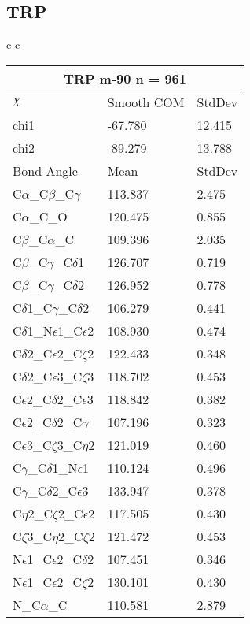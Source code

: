 \newpage
\subsection{TRP}

\begin{longtable}{ c c }

  \begin{tabular}{ l l l }
  \toprule
  \multicolumn{3}{c}{TRP \textbf{m-90} n = 961} \\ \toprule
  $\chi$       & Smooth COM & StdDev \\ \midrule
  chi1 & -67.780 & 12.415 \\ 
  chi2 & -89.279 & 13.788 \\ \midrule
  Bond Angle   & Mean     & StdDev \\ \midrule
  C$\alpha$\_C$\beta$\_C$\gamma$ & 113.837 & 2.475\\
  C$\alpha$\_C\_O & 120.475 & 0.855\\
  C$\beta$\_C$\alpha$\_C & 109.396 & 2.035\\
  C$\beta$\_C$\gamma$\_C$\delta$1 & 126.707 & 0.719\\
  C$\beta$\_C$\gamma$\_C$\delta$2 & 126.952 & 0.778\\
  C$\delta$1\_C$\gamma$\_C$\delta$2 & 106.279 & 0.441\\
  C$\delta$1\_N$\epsilon$1\_C$\epsilon$2 & 108.930 & 0.474\\
  C$\delta$2\_C$\epsilon$2\_C$\zeta$2 & 122.433 & 0.348\\
  C$\delta$2\_C$\epsilon$3\_C$\zeta$3 & 118.702 & 0.453\\
  C$\epsilon$2\_C$\delta$2\_C$\epsilon$3 & 118.842 & 0.382\\
  C$\epsilon$2\_C$\delta$2\_C$\gamma$ & 107.196 & 0.323\\
  C$\epsilon$3\_C$\zeta$3\_C$\eta$2 & 121.019 & 0.460\\
  C$\gamma$\_C$\delta$1\_N$\epsilon$1 & 110.124 & 0.496\\
  C$\gamma$\_C$\delta$2\_C$\epsilon$3 & 133.947 & 0.378\\
  C$\eta$2\_C$\zeta$2\_C$\epsilon$2 & 117.505 & 0.430\\
  C$\zeta$3\_C$\eta$2\_C$\zeta$2 & 121.472 & 0.453\\
  N$\epsilon$1\_C$\epsilon$2\_C$\delta$2 & 107.451 & 0.346\\
  N$\epsilon$1\_C$\epsilon$2\_C$\zeta$2 & 130.101 & 0.430\\
  N\_C$\alpha$\_C & 110.581 & 2.879\\

\end{tabular}
\end{longtable}
